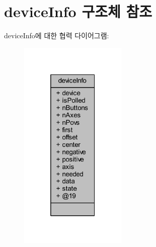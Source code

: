 \hypertarget{structdevice_info}{}\section{device\+Info 구조체 참조}
\label{structdevice_info}


device\+Info에 대한 협력 다이어그램\+:\nopagebreak
\begin{figure}[H]
\begin{center}
\leavevmode
\includegraphics[width=145pt]{structdevice_info__coll__graph}
\end{center}
\end{figure}
